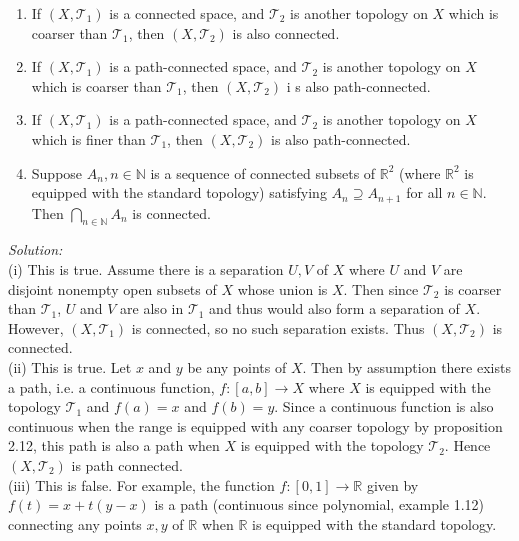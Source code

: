 \documentclass[a4paper]{article}
\begin{document}
\begin{enumerate}[label=(\roman*)]
    \item If $(X,\mathcal{T}_1)$ is a connected space, and $\mathcal{T}_2$ is
        another topology on $X$ which is coarser than $\mathcal{T}_1$, then
        $(X, \mathcal{T}_2)$ is also connected.
    \item If $(X, \mathcal{T}_1)$ is a path-connected space, and
        $\mathcal{T}_2$ is another topology on $X$ which is coarser than
        $\mathcal{T}_1$, then $(X, \mathcal{T}_2)$ i s also path-connected.
    \item If $(X, \mathcal{T}_1)$ is a path-connected space, and
        $\mathcal{T}_2$ is another topology on $X$ which is finer than
        $\mathcal{T}_1$, then $(X, \mathcal{T}_2)$ is also path-connected.
    \item Suppose $A_n, n \in \mathbb{N}$ is a sequence of connected subsets of
        $\mathbb{R}^2$ (where $\mathbb{R}^2$ is equipped with the standard
        topology) satisfying $A_n \supseteq A_{n+1}$ for all $n \in
        \mathbb{N}$. Then $\bigcap_{n \in \mathbb{N}} A_n$ is connected.
\end{enumerate}
\textit{Solution:}\\
(i) This is true. Assume there is a separation $U,V$ of $X$ where $U$ and $V$
are disjoint nonempty open subsets of $X$ whose union is $X$. Then since
$\mathcal{T}_2$ is coarser than $\mathcal{T}_1$, $U$ and $V$ are also in
$\mathcal{T}_1$ and thus would also form a separation of $X$. However, $(X,
\mathcal{T}_1)$ is connected, so no such separation exists. Thus $(X,
\mathcal{T}_2)$ is connected.\\
\linebreak
(ii) This is true. Let $x $ and $y$ be any points of $X$. Then by assumption there exists
a path, i.e. a continuous function, $f \colon [a,b] \to X$ where $X$ is equipped with the topology
$\mathcal{T}_1$ and $f(a) = x$ and $f(b) = y$. Since a continuous function is
also continuous when the range is equipped with any coarser topology by
proposition 2.12, this path
is also a path when $X$ is equipped with the topology $\mathcal{T}_2$. Hence
$(X, \mathcal{T}_2)$ is path connected.\\
\linebreak
(iii) This is false. For example, the function $f \colon [0,1] \to \mathbb{R}$ 
given by $f(t) = x + t(y-x)$ is a path (continuous since polynomial, example
1.12) connecting any points  $x,y$ of
$\mathbb{R}$ when $\mathbb{R}$ is equipped with the standard topology. 
\end{document}
